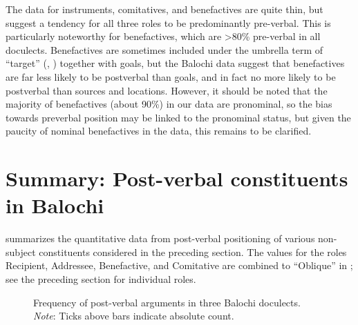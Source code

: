 \documentclass[output=paper,colorlinks,citecolor=brown,draftmode]{langscibook}
\begin{document}
The data for instruments, comitatives, and benefactives are quite thin, but suggest a tendency for all three roles to be predominantly pre-verbal. This is particularly noteworthy for benefactives, which are >80\% pre-verbal in all doculects. Benefactives are sometimes included under the umbrella term of ``target'' (\citealt{asadpour_typologizing_2022,asadpour_word_2022}, \citealt{Korn2022Targets}) together with goals, but the Balochi data suggest that benefactives are far less likely to be postverbal than goals, and in fact no more likely to be postverbal than sources and locations. However, it should be noted that the majority of benefactives (about 90\%) in our data are pronominal, so the bias towards preverbal position may be linked to the pronominal status, but given the paucity of nominal benefactives in the data, this remains to be clarified.

\section{Summary: Post-verbal constituents in Balochi}\label{Balochi:ss:5}

 summarizes the quantitative data from post-verbal positioning of various non-subject constituents considered in the preceding section. The values for the roles Recipient, Addressee, Benefactive, and Comitative are combined to ``Oblique'' in ; see the preceding section for individual roles.

\begin{figure}
    \ChapterFourFigureTwoData
    \caption{Frequency of post-verbal arguments in three Balochi doculects. \emph{Note}: Ticks above bars indicate absolute count.}
    \label{Balochi:fig:2}
\end{figure}
\end{document}

